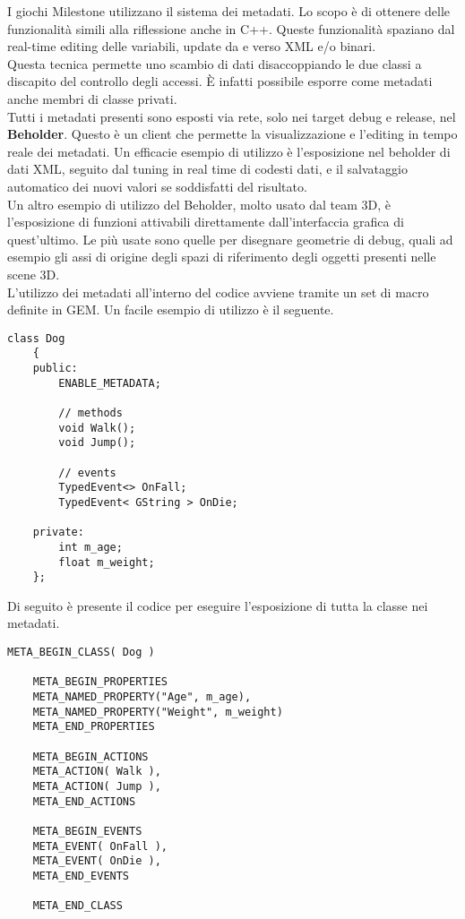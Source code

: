 I giochi Milestone utilizzano il sistema dei metadati. Lo scopo è di ottenere delle funzionalità simili alla riflessione anche in C++. Queste funzionalità spaziano dal real-time editing delle variabili, update da e verso XML e/o binari.\\

Questa tecnica permette uno scambio di dati disaccoppiando le due classi a discapito del controllo degli accessi. È infatti possibile esporre come metadati anche membri di classe privati.\\

Tutti i metadati presenti sono esposti via rete, solo nei target debug e release, nel \textbf{Beholder}. Questo è un client che permette la visualizzazione e l'editing in tempo reale dei metadati. Un efficacie esempio di utilizzo è l'esposizione nel beholder di dati XML, seguito dal tuning in real time di codesti dati, e il salvataggio automatico dei nuovi valori se soddisfatti del risultato.\\

Un altro esempio di utilizzo del Beholder, molto usato dal team 3D, è l'esposizione di funzioni attivabili direttamente dall'interfaccia grafica di quest'ultimo. Le più usate sono quelle per disegnare geometrie di debug, quali ad esempio gli assi di origine degli spazi di riferimento degli oggetti presenti nelle scene 3D.\\

L'utilizzo dei metadati all'interno del codice avviene tramite un set di macro definite in GEM. Un facile esempio di utilizzo è il seguente.\\

\begin{lstlisting}[style=maurizio-code]
	class Dog
	{
	public:
		ENABLE_METADATA;

		// methods
		void Walk();
		void Jump();

		// events
		TypedEvent<> OnFall;
		TypedEvent< GString > OnDie;

	private:
		int m_age;
		float m_weight;
	};
\end{lstlisting}

Di seguito è presente il codice per eseguire l'esposizione di tutta la classe nei metadati.

\begin{lstlisting}[style=maurizio-code]
	META_BEGIN_CLASS( Dog )
	
	META_BEGIN_PROPERTIES
	META_NAMED_PROPERTY("Age", m_age),
	META_NAMED_PROPERTY("Weight", m_weight)
	META_END_PROPERTIES
	
	META_BEGIN_ACTIONS
	META_ACTION( Walk ),
	META_ACTION( Jump ),
	META_END_ACTIONS
	
	META_BEGIN_EVENTS
	META_EVENT( OnFall ),
	META_EVENT( OnDie ),
	META_END_EVENTS
	
	META_END_CLASS
\end{lstlisting}


